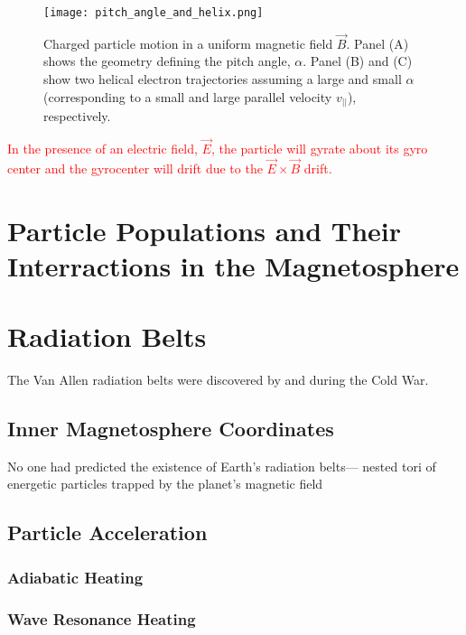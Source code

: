 \begin{figure}
\texttt{[image: pitch\_angle\_and\_helix.png]}
\caption{Charged particle motion in a uniform magnetic field $\vec{B}$. Panel (A) shows the geometry defining the pitch angle, $\alpha$. Panel (B) and (C) show two helical electron trajectories assuming a large and small $\alpha$ (corresponding to a small and large parallel velocity $v_{||}$), respectively.}
\label{Intro:pa}
\end{figure}


\textcolor{red}{In the presence of an electric field, $\vec{E}$, the particle will gyrate about its gyro center and the gyrocenter will drift due to the $\vec{E} \times \vec{B}$ drift.}

\section{Particle Populations and Their Interractions in the Magnetosphere}\label{ntro:particle_populations}

\section{Radiation Belts}\label{Intro:radiation_belt}
The Van Allen radiation belts were discovered by \citet{Allen1959} and \citet{Vernov1960} during the Cold War.

\subsection{Inner Magnetosphere Coordinates}\label{Intro:coords}


 No one had predicted the
existence of Earth’s radiation belts—
nested tori of energetic particles trapped
by the planet’s magnetic field

\subsection{Particle Acceleration}\label{Intro:acceleration}

\subsubsection{Adiabatic Heating}\label{Intro:adiabatic_heating}

\subsubsection{Wave Resonance Heating}\label{Intro:wave_heating}

